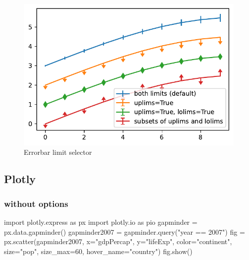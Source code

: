 \documentclass[
  letterpaper,
  DIV=11,
  numbers=noendperiod,
  oneside]{scrartcl}
\newenvironment{Shaded}{\begin{snugshade}}{\end{snugshade}}
\newcommand{\DecValTok}[1]{\textcolor[rgb]{0.68,0.00,0.00}{#1}}
\newcommand{\ImportTok}[1]{\textcolor[rgb]{0.00,0.46,0.62}{#1}}
\newcommand{\NormalTok}[1]{\textcolor[rgb]{0.00,0.23,0.31}{#1}}
\newcommand{\OperatorTok}[1]{\textcolor[rgb]{0.37,0.37,0.37}{#1}}
\newcommand{\StringTok}[1]{\textcolor[rgb]{0.13,0.47,0.30}{#1}}
\begin{document}
\begin{figure}[H]

{\centering \includegraphics{start-with-quarto_files/figure-pdf/fig-limits-output-1.pdf}

}

\caption{\label{fig-limits}Errorbar limit selector}

\end{figure}

\hypertarget{plotly}{%
\subsection{Plotly}\label{plotly}}

\hypertarget{without-options}{%
\subsubsection{without options}\label{without-options}}

\begin{Shaded}
\begin{Highlighting}[]
\ImportTok{import}\NormalTok{ plotly.express }\ImportTok{as}\NormalTok{ px}
\ImportTok{import}\NormalTok{ plotly.io }\ImportTok{as}\NormalTok{ pio}
\NormalTok{gapminder }\OperatorTok{=}\NormalTok{ px.data.gapminder()}
\NormalTok{gapminder2007 }\OperatorTok{=}\NormalTok{ gapminder.query(}\StringTok{"year == 2007"}\NormalTok{)}
\NormalTok{fig }\OperatorTok{=}\NormalTok{ px.scatter(gapminder2007, }
\NormalTok{                 x}\OperatorTok{=}\StringTok{"gdpPercap"}\NormalTok{, y}\OperatorTok{=}\StringTok{"lifeExp"}\NormalTok{, color}\OperatorTok{=}\StringTok{"continent"}\NormalTok{, }
\NormalTok{                 size}\OperatorTok{=}\StringTok{"pop"}\NormalTok{, size\_max}\OperatorTok{=}\DecValTok{60}\NormalTok{,}
\NormalTok{                 hover\_name}\OperatorTok{=}\StringTok{"country"}\NormalTok{)}
\NormalTok{fig.show()}
\end{Highlighting}
\end{Shaded}
\end{document}
